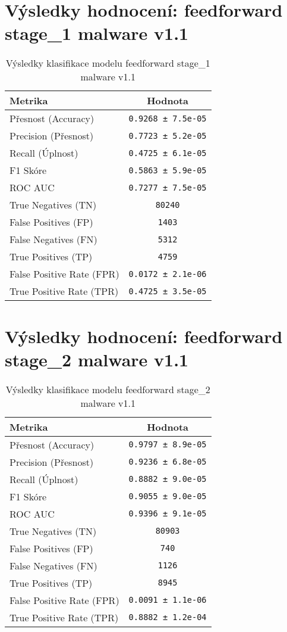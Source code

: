 \section*{Výsledky hodnocení: feedforward stage_1 malware v1.1}
\begin{table}[h!]
\centering
\begin{tabular}{|l|c|}
\hline
\textbf{Metrika} & \textbf{Hodnota} \\
\hline
Přesnost (Accuracy) & \texttt{0.9268 ± 7.5e-05} \\
Precision (Přesnost) & \texttt{0.7723 ± 5.2e-05} \\
Recall (Úplnost) & \texttt{0.4725 ± 6.1e-05} \\
F1 Skóre & \texttt{0.5863 ± 5.9e-05} \\
ROC AUC & \texttt{0.7277 ± 7.5e-05} \\
True Negatives (TN) & \texttt{80240} \\
False Positives (FP) & \texttt{1403} \\
False Negatives (FN) & \texttt{5312} \\
True Positives (TP) & \texttt{4759} \\
False Positive Rate (FPR) & \texttt{0.0172 ± 2.1e-06} \\
True Positive Rate (TPR) & \texttt{0.4725 ± 3.5e-05} \\
\hline
\end{tabular}
\caption{Výsledky klasifikace modelu feedforward stage_1 malware v1.1}
\label{tab:malware_feedforward}
\end{table}

\section*{Výsledky hodnocení: feedforward stage_2 malware v1.1}
\begin{table}[h!]
\centering
\begin{tabular}{|l|c|}
\hline
\textbf{Metrika} & \textbf{Hodnota} \\
\hline
Přesnost (Accuracy) & \texttt{0.9797 ± 8.9e-05} \\
Precision (Přesnost) & \texttt{0.9236 ± 6.8e-05} \\
Recall (Úplnost) & \texttt{0.8882 ± 9.0e-05} \\
F1 Skóre & \texttt{0.9055 ± 9.0e-05} \\
ROC AUC & \texttt{0.9396 ± 9.1e-05} \\
True Negatives (TN) & \texttt{80903} \\
False Positives (FP) & \texttt{740} \\
False Negatives (FN) & \texttt{1126} \\
True Positives (TP) & \texttt{8945} \\
False Positive Rate (FPR) & \texttt{0.0091 ± 1.1e-06} \\
True Positive Rate (TPR) & \texttt{0.8882 ± 1.2e-04} \\
\hline
\end{tabular}
\caption{Výsledky klasifikace modelu feedforward stage_2 malware v1.1}
\label{tab:malware_feedforward}
\end{table}

